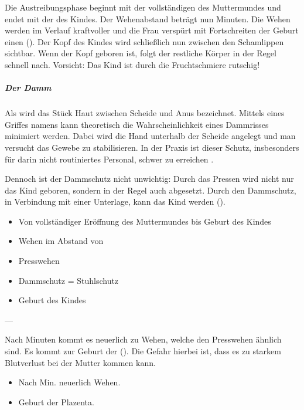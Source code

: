 {%
Die Austreibungsphase beginnt mit der
vollständigen  des Muttermundes \Z{(10\CM*)}
und endet mit der  des Kindes.
\cite{BuehlingGynaekologie1,HaagGyn2007}
Der Wehenabstand beträgt nun 
Minuten. Die Wehen werden im Verlauf kraftvoller und die
Frau verspürt mit Fortschreiten der Geburt einen
(). Der Kopf des Kindes wird
schließlich nun zwischen den Schamlippen  sichtbar.
Wenn der Kopf geboren ist, folgt der restliche Körper in der
Regel schnell nach. Vorsicht: Das Kind ist durch die
Fruchtschmiere rutschig!

\subparagraph{Der Damm}
\label{topic:dammschutz}
Als  wird das Stück Haut zwischen Scheide und Anus
bezeichnet. Mittels eines
Griffes namens  kann
theoretisch die Wahrscheinlichkeit eines Dammrisses
minimiert werden. Dabei wird die Hand unterhalb der
Scheide angelegt und man versucht das Gewebe zu
stabilisieren. In der Praxis ist dieser Schutz, insbesonders
für darin nicht routiniertes Personal, schwer zu erreichen
\cite{AsboeLehrmeinung2011-20}.

Dennoch ist der Dammschutz nicht unwichtig: Durch das
Pressen wird nicht nur das Kind geboren, sondern in der
Regel auch   abgesetzt. Durch den Dammschutz, in
Verbindung mit einer Unterlage, kann das Kind  werden ().

}{%
\begin{itemize}
  \item Von vollständiger Eröffnung des Muttermundes bis
  Geburt des Kindes
  \item Wehen im Abstand von \Min*
  \item Presswehen
  \item Dammschutz = Stuhlschutz
  \item Geburt des Kindes
\end{itemize}
}
{}
{}
{---}






{%
Nach  Minuten kommt es neuerlich zu Wehen,
welche den Presswehen ähnlich sind. Es kommt zur Geburt der
 (). Die Gefahr hierbei ist,
dass es zu starkem Blutverlust bei der Mutter kommen kann.
}{
\begin{itemize}  
    \item Nach  Min. neuerlich Wehen. 
    \item Geburt der Plazenta.
\end{itemize}
}{}{}{}




